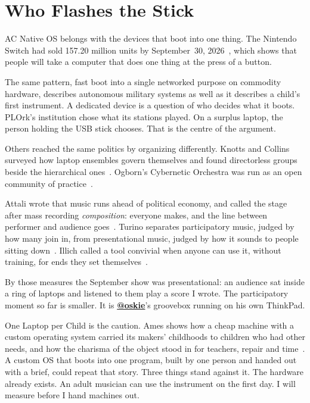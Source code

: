 \documentclass[10pt,letterpaper,twocolumn]{article}
\makeatletter
\newcommand{\acos}{AC Native OS}
\DeclareRobustCommand{\handle}[1]{\href{https://prompt.ac/@#1}{\textbf{\color{achandle}@#1}}}
\makeatother
\begin{document}
\section{Who Flashes the Stick}
\label{sec:devices}

\acos{} belongs with the devices that boot into one thing. The Nintendo Switch had sold 157.20 million units by September~30, 2026~\citep{nintendo2026units}, which shows that people will take a computer that does one thing at the press of a button.

The same pattern, fast boot into a single networked purpose on commodity hardware, describes autonomous military systems as well as it describes a child's first instrument. A dedicated device is a question of who decides what it boots. PLOrk's institution chose what its stations played. On a surplus laptop, the person holding the USB stick chooses. That is the centre of the argument.

Others reached the same politics by organizing differently. Knotts and Collins surveyed how laptop ensembles govern themselves and found directorless groups beside the hierarchical ones~\citep{knotts2014politics}. Ogborn's Cybernetic Orchestra was run as an open community of practice~\citep{ogborn2014scalable}.

Attali wrote that music runs ahead of political economy, and called the stage after mass recording \emph{composition}: everyone makes, and the line between performer and audience goes~\citep{attali1985noise}. Turino separates participatory music, judged by how many join in, from presentational music, judged by how it sounds to people sitting down~\citep{turino2008music}. Illich called a tool convivial when anyone can use it, without training, for ends they set themselves~\citep{illich1973tools}.

By those measures the September show was presentational: an audience sat inside a ring of laptops and listened to them play a score I wrote. The participatory moment so far is smaller. It is \handle{oskie}'s groovebox running on his own ThinkPad.

One Laptop per Child is the caution. Ames shows how a cheap machine with a custom operating system carried its makers' childhoods to children who had other needs, and how the charisma of the object stood in for teachers, repair and time~\citep{ames2019charisma}. A custom OS that boots into one program, built by one person and handed out with a brief, could repeat that story. Three things stand against it. The hardware already exists. An adult musician can use the instrument on the first day. I will measure before I hand machines out.
\end{document}
